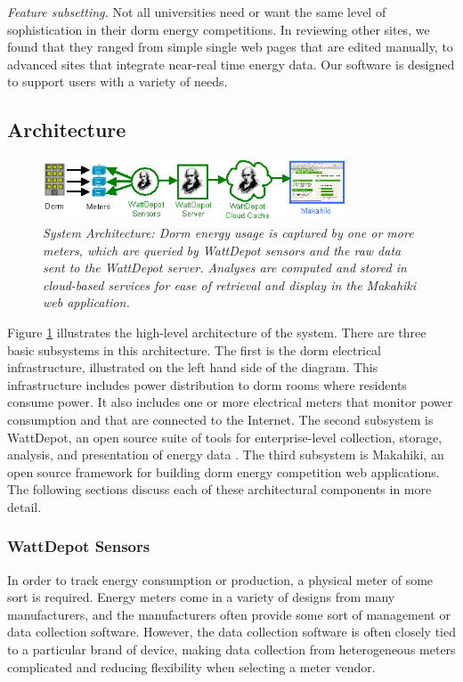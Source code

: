 {\em Feature subsetting.} Not all universities need or want the same 
level of sophistication in their dorm energy competitions.  In reviewing 
other sites, we found that they ranged from simple single web pages that are 
edited manually, to advanced sites that integrate near-real time energy data. 
Our software is designed to support users with a variety of needs. 

\subsection{Architecture}

\begin{figure}[!th]
  \center
  \includegraphics[width=0.8\textwidth]{architecture.eps}
  \caption{\em \small System Architecture: Dorm energy usage is captured by one or more meters, which 
are queried by WattDepot sensors and the raw data sent to the WattDepot server. Analyses are computed
and stored in cloud-based services for ease of retrieval and display in the Makahiki web application.}
  \label{fig:architecture}
\end{figure} 

Figure \ref{fig:architecture} illustrates the high-level architecture of the
system. There are three basic subsystems in this architecture.  The first is the
dorm electrical infrastructure, illustrated on the left hand side of the
diagram.  This infrastructure includes power distribution to dorm rooms where
residents consume power.  It also includes one or more electrical meters that
monitor power consumption and that are connected to the Internet.  The second
subsystem is WattDepot, an open source suite of tools for enterprise-level
collection, storage, analysis, and presentation of energy data
\cite{Brewer2010WattDepot, WattDepot}. The third subsystem is Makahiki, an open source
framework for building dorm energy competition web applications. The following
sections discuss each of these architectural components in more detail.

\subsubsection{WattDepot Sensors}

In order to track energy consumption or production, a physical meter of some
sort is required. Energy meters come in a variety of designs from many
manufacturers, and the manufacturers often provide some sort of management
or data collection software. However, the data collection software is often
closely tied to a particular brand of device, making data collection from
heterogeneous meters complicated and reducing flexibility when selecting a
meter vendor.

